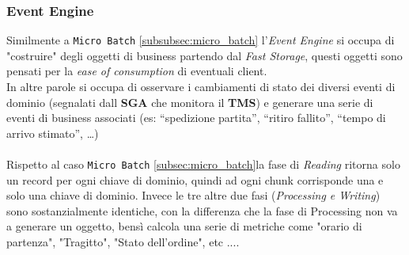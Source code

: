 \subsubsection{Event Engine}
\label{subsubsec:event_engine}
Similmente a \texttt{Micro Batch} \ref{subsubsec:micro_batch} l'\textit{Event Engine} si occupa di "costruire" degli oggetti di business partendo dal \textit{Fast Storage}, questi oggetti sono pensati per la \textit{ease of consumption} di eventuali client.\\
In altre parole si occupa di osservare i cambiamenti di stato dei diversi eventi di dominio (segnalati dall \textbf{SGA} che monitora il \textbf{TMS}) e generare una serie di eventi di business associati (es: 
“spedizione partita”, “ritiro fallito”, “tempo di arrivo stimato”, …)\\\\
Rispetto al caso \texttt{Micro Batch} \ref{subsec:micro_batch}la fase di \textit{Reading} ritorna solo un record per ogni chiave di dominio, quindi ad ogni chunk corrisponde una e solo una chiave di dominio.
Invece le tre altre due fasi (\textit{Processing e Writing}) sono sostanzialmente identiche, con la differenza che la fase di Processing non va a generare un oggetto, bensì calcola una serie di metriche come "orario di partenza", "Tragitto", "Stato dell'ordine", etc ....